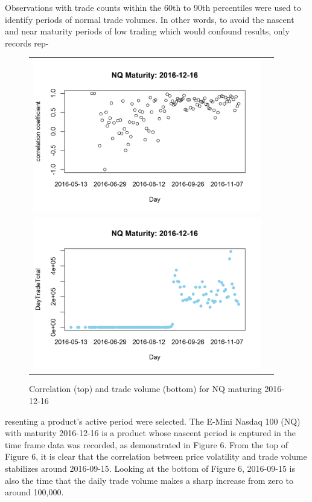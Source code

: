 \documentclass[12pt]{article}
\begin{document}
Observations with trade counts within the 60th to 90th percentiles were used to identify periods of normal trade volumes. In other words, to avoid the nascent and near maturity periods of low trading which would confound results, only records rep-

\begin{figure}[H]
	\begin{center}
		\begin{tabular}{cc}
			\includegraphics[width=10cm]{NQcor_plot.png} \\ 
			\includegraphics[width=10cm]{NQtradevolume.png}	\\ 
		\end{tabular}
	\end{center}
	\caption{Correlation (top) and trade volume (bottom) for NQ maturing 2016-12-16}
	\label{fig:NQ}
\end{figure}

\noindent resenting a product's active period were selected. The E-Mini Nasdaq 100 (NQ) with maturity 2016-12-16 is a product whose nascent period is captured in the time frame data was recorded, as demonstrated in Figure 6. From the top of Figure 6, it is clear that the correlation between price volatility and trade volume stabilizes around 2016-09-15. Looking at the bottom of Figure 6, 2016-09-15 is also the time that the daily trade volume makes a sharp increase from zero to around 100,000.  
\end{document}
